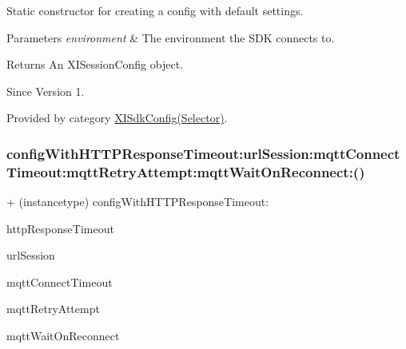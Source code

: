 Static constructor for creating a config with default settings. 


\begin{DoxyParams}{Parameters}
{\em environment} & The environment the S\+DK connects to. \\
\hline
\end{DoxyParams}
\begin{DoxyReturn}{Returns}
An X\+I\+Session\+Config object. 
\end{DoxyReturn}
\begin{DoxySince}{Since}
Version 1. 
\end{DoxySince}


Provided by category \hyperlink{category_x_i_sdk_config_07_selector_08_afa1234314350e4363b3540809540812b}{X\+I\+Sdk\+Config(\+Selector)}.

\hypertarget{class_x_i_sdk_config_ad84b287f2b68f614ffa522dfab020af3}{}\label{class_x_i_sdk_config_ad84b287f2b68f614ffa522dfab020af3} 
\subsubsection{\texorpdfstring{config\+With\+H\+T\+T\+P\+Response\+Timeout\+:url\+Session\+:mqtt\+Connect\+Timeout\+:mqtt\+Retry\+Attempt\+:mqtt\+Wait\+On\+Reconnect\+:()}{configWithHTTPResponseTimeout:urlSession:mqttConnectTimeout:mqttRetryAttempt:mqttWaitOnReconnect:()}}
{\footnotesize\ttfamily + (instancetype) config\+With\+H\+T\+T\+P\+Response\+Timeout\+: \begin{DoxyParamCaption}\item[{(long)}]{http\+Response\+Timeout }\item[{urlSession:(N\+S\+U\+R\+L\+Session $\ast$)}]{url\+Session }\item[{mqttConnectTimeout:(long)}]{mqtt\+Connect\+Timeout }\item[{mqttRetryAttempt:(int)}]{mqtt\+Retry\+Attempt }\item[{mqttWaitOnReconnect:(long)}]{mqtt\+Wait\+On\+Reconnect }\end{DoxyParamCaption}}



